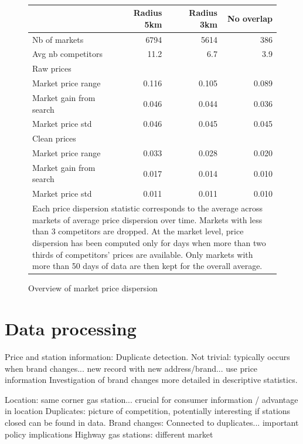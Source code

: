 \documentclass[11pt]{article}
\begin{document}
\ \\
\begin{figure}
\caption{Overview of market price dispersion}
\begin{center}
\begin{tabular}{lrrr}
\hline
{} & Radius 5km & Radius 3km & No overlap\\
\hline
Nb of markets & 6794 & 5614 & 386 \\
Avg nb competitors & 11.2 & 6.7 & 3.9 \\
\hline
Raw prices & & & \\
\hline
Market price range & 0.116 & 0.105 & 0.089\\
Market gain from search & 0.046 & 0.044 & 0.036 \\
Market price std & 0.046 & 0.045 & 0.045 \\
\hline
Clean prices & & & \\
\hline
Market price range & 0.033  & 0.028 & 0.020 \\
Market gain from search & 0.017 & 0.014 & 0.010 \\
Market price std & 0.011 & 0.011 & 0.010 \\
\hline
\multicolumn{4}{p{.8\textwidth}}{Each price dispersion statistic corresponds to the average across markets of average price dispersion over time. Markets with less than 3 competitors are dropped. At the market level, price dispersion has been computed only for days when more than two thirds of competitors' prices are available. Only markets with more than 50 days of data are then kept for the overall average.}
\end{tabular}
\end{center}
\end{figure}

\newpage



\newpage

\appendix

\section{Data processing}

Price and station information: Duplicate detection. Not trivial: typically occurs when brand changes... new record with new address/brand... use price information
Investigation of brand changes more detailed in descriptive statistics.

Location: same corner gas station... crucial for consumer information / advantage in location
Duplicates: picture of competition, potentially interesting if stations closed can be found in data.
Brand changes: Connected to duplicates... important policy implications
Highway gas stations: different market
\end{document}
